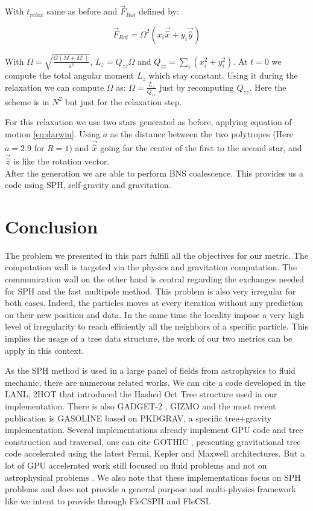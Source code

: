 With $t_{relax}$ same as before and $\vec{F}_{Rot}$ defined by:

\begin{equation}
\vec{F}_{Rot} = \Omega^2(x_i \vec{\hat{x}}+y_i\vec{\hat{y}})
\end{equation}

With $\Omega = \sqrt{\frac{G(M+M')}{a^3}}$, $L_z = Q_{zz}\Omega$ and $Q_{zz} = \sum_i(x_i^2+y_i^2)$. At $t=0$ we compute the total angular moment $L_z$ which stay constant.
Using it during the relaxation we can compute $\Omega$ as: $\Omega = \frac{L_z}{Q_{zz}}$ just by recomputing $Q_{zz}$.
Here the scheme is in $N^2$ but just for the relaxation step. 

For this relaxation we use two stars generated as before, applying equation of motion \ref{eq:darwin}.
Using $a$ as the distance between the two polytropes  (Here $a=2.9$ for $R=1$) and $\vec{\hat{x}}$ going for the center of the first to the second star, and $\vec{\hat{z}}$ is like the rotation vector.\\

After the generation we are able to perform BNS coalescence. 
This provides us a code using SPH, self-gravity and gravitation. 

\section{Conclusion}
The problem we presented in this part fulfill all the objectives for our metric. 
The computation wall is targeted via the physics and gravitation computation. 
The communication wall on the other hand is central regarding the exchanges needed for SPH and the fast multipole method. 
This problem is also very irregular for both cases. 
Indeed, the particles moves at every iteration without any prediction on their new position and data. 
In the same time the locality impose a very high level of irregularity to reach efficiently all the neighbors of a specific particle. 
This implies the usage of a tree data structure, the work of our two metrics can be apply in this context. 

As the SPH method is used in a large panel of fields from astrophysics to fluid mechanic, there are numerous related works. 
We can cite a code developed in the LANL, 2HOT \cite{warren20132hot} that introduced the Hashed Oct Tree structure used in our implementation. 
There is also GADGET-2 \cite{springel2005cosmological}, GIZMO \cite{hopkins2014gizmo} and the most recent publication is GASOLINE \cite{wadsley2017gasoline2} based on PKDGRAV, a specific tree+gravity implementation. 
Several implementations already implement GPU code and tree construction and traversal, one can cite GOTHIC \cite{miki2017gothic}, presenting gravitational tree code accelerated using the latest Fermi, Kepler and Maxwell architectures. But a lot of GPU accelerated work still focused on fluid problems and not on astrophysical problems  \cite{harada2007smoothed,crespo2011gpus}.
We also note that these implementations focus on SPH problems and does not provide a general purpose and multi-physics framework like we intent to provide through FleCSPH and FleCSI. 

